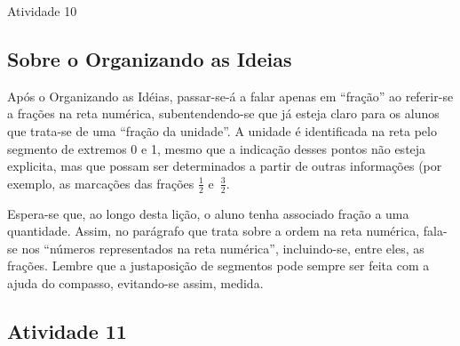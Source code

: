 \begin{multicols}{2}
\begin{resposta*}{Atividade 10}

\end{resposta*}
\vspace{-.2cm}

\subsection{Sobre o Organizando as Ideias}

Após o Organizando as Idéias, passar-se-á a falar apenas em ``fração'' ao referir-se a frações na reta numérica, subentendendo-se que já esteja claro para os alunos que trata-se de uma ``fração da unidade''. A unidade é identificada na reta pelo segmento de extremos 0 e 1, mesmo que a indicação desses pontos não esteja explicita, mas que possam ser determinados a partir de outras informações (por exemplo, as marcações das frações  $\frac{1}{2}$ e~$\frac{3}{2}$.

Espera-se que, ao longo desta lição, o aluno tenha associado fração a uma quantidade. Assim, no parágrafo que trata sobre a ordem na reta numérica, fala-se nos ``números representados na reta numérica'', incluindo-se, entre eles, as frações.
Lembre que a justaposição de segmentos pode sempre ser feita com a ajuda do compasso, evitando-se assim, medida.

\Bg
\Bg


\subsection{Atividade 11}


\end{multicols}
